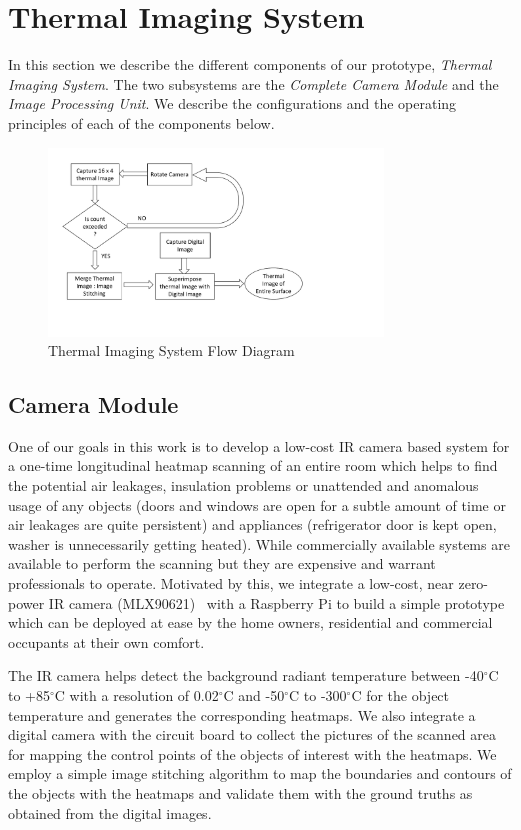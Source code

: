\section{Thermal Imaging System}
In this section we describe the different components of our prototype, {\it Thermal Imaging System}. The two subsystems are the {\it Complete Camera Module} and the {\it Image Processing Unit}. We describe the configurations and the operating principles of each of the components below.

\begin{figure}[!htb]
\begin{center}
 \includegraphics[width=3.5in]{figs/FlowDiagram.pdf} 
 \caption{Thermal Imaging System Flow Diagram}
 \label{fig:Flow}
\end{center}
\end{figure}
	
	
\subsection{Camera Module}
\label{sec:camera}

One of our goals in this work is to develop a low-cost IR camera based system for a one-time longitudinal heatmap scanning of an entire room which helps to find the potential air leakages, insulation problems or unattended and anomalous usage of any objects (doors and windows are open for a subtle amount of time or air leakages are quite persistent) and appliances (refrigerator door is kept open, washer is unnecessarily getting heated). While commercially available systems are available to perform the scanning but they are expensive and warrant professionals to operate. Motivated by this, we integrate a low-cost, near zero-power IR camera (MLX90621)~\cite{XX} with a Raspberry Pi to build a simple prototype which can be deployed at ease by the home owners, residential and commercial occupants at their own comfort. 

The IR camera helps detect the background radiant temperature between -40$^{\circ}$C to +85$^{\circ}$C with a resolution of 0.02$^{\circ}$C and -50$^{\circ}$C to -300$^{\circ}$C for the object temperature and generates the corresponding heatmaps. We also integrate a digital camera with the circuit board to collect the  pictures of the scanned area for mapping the control points of the objects of interest with the heatmaps. We employ a simple image stitching algorithm to map the boundaries and contours of the objects with the heatmaps and validate them with the ground truths as obtained from the digital images. 

